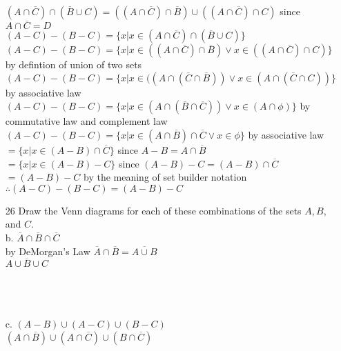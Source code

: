\documentclass[a4paper]{article}
\newcommand\tab[1][0.5cm]{\hspace*{#1}}
\def\fourthcircle{(135:2.5cm) circle (2.5cm)}
\def\fifthcircle{(45:2.5cm) circle (2.5cm)}
\def\sixthcircle{(270:1.3cm) circle (2.5cm)}
\begin{document}
\begin{itemize}
  \tab $(A \cap \overline{C}) \cap (\overline{B} \cup C) = ((A \cap \overline{C}) \cap \overline{B}) \cup ((A \cap \overline{C}) \cap C)$ since $A \cap \overline{C} = D$ \\
  \tab $(A - C) - (B - C) = \{x|x \in (A \cap \overline{C}) \cap (\overline{B} \cup C)\}$ \\
  \tab $(A - C) - (B - C) = \{x|x \in ((A \cap \overline{C}) \cap \overline{B}) \lor x \in ((A \cap \overline{C}) \cap C)\}$ by defintion of union of two sets \\
  \tab $(A - C) - (B - C) = \{x|x \in ((A \cap (\overline{C} \cap \overline{B})) \lor x \in (A \cap (\overline{C} \cap C))\}$ by associative law \\
  \tab $(A - C) - (B - C) = \{x|x \in (A \cap (\overline{B} \cap \overline{C})) \lor x \in (A \cap \phi)\}$ by commutative law and complement law \\
  \tab $(A - C) - (B - C) = \{x|x \in (A \cap \overline{B}) \cap \overline{C} \lor x \in \phi\}$ by associative law \\
  \tab $= \{x|x \in (A - B) \cap \overline{C}\}$ since $A - B = A \cap \overline{B}$ \\
  \tab $= \{x|x \in (A - B) - C\}$ since $(A - B) - C = (A - B) \cap \overline{C}$ \\
  \tab $= (A - B) - C$ by the meaning of set builder notation \\
  \tab $\therefore (A - C) - (B - C) = (A - B) - C$
  \item[26] Draw the Venn diagrams for each of these combinations of the sets $A, B$, and $C$. \\
    b. $\overline{A} \cap \overline{B} \cap \overline{C}$ \\
    \tab by DeMorgan's Law $\overline{A} \cap \overline{B} = \overline{A \cup B}$\\
    \tab $\overline{A \cup B \cup C}$ \\ \\
     \\ \\
    c. $(A - B) \cup (A - C) \cup (B - C)$ \\
    \tab $(A \cap \overline{B}) \cup (A \cap \overline{C}) \cup (B \cap \overline{C})$ \\

\end{itemize}
\end{document}

